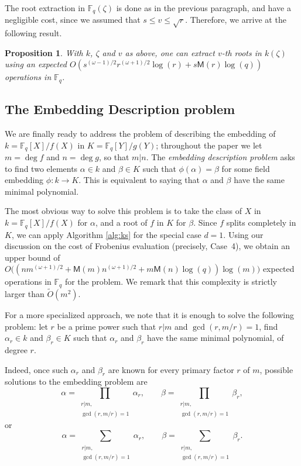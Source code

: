 \documentclass{mcom-l}
\theoremstyle{plain}
\newtheorem{proposition}[theorem]{Proposition}
\theoremstyle{definition}
\newcommand{\tildO}{\tilde{O}}
\newcommand{\F}{\ensuremath{\mathbb{F}}}
\newcommand{\MM}{\ensuremath{\mathsf{M}}}
\begin{document}
The root extraction in $\F_q(\zeta)$ is done as in the previous
paragraph, and have a negligible cost, since we assumed that $s \le v
\le \sqrt{r}$. Therefore, we arrive at the following result.

\begin{proposition}\label{prop:root_high_degree_extension}
With $k$, $\zeta$ and $v$ as above, one can extract $v$-th roots in
$k(\zeta)$ using an expected
$O(s^{(\omega-1)/2}r^{(\omega+1)/2}\log(r) + s\MM(r)\log(q))$
operations in $\F_q$.
\end{proposition}




\subsection{The Embedding Description problem}

We are finally ready to address the problem of describing the embedding of
$k=\F_q[X]/f(X)$ in $K=\F_q[Y]/g(Y)$; throughout the paper we let $m=\deg f$ and
$n=\deg g$, so that $m|n$. The \emph{embedding description problem}
asks to find two elements $\alpha\in k$ and $\beta\in K$ such that
$\phi(\alpha)=\beta$ for some field embedding $\phi:k\to K$. This is
equivalent to saying that $\alpha$ and $\beta$ have the same minimal polynomial.

The most obvious way to solve this problem is to take the class of $X$
in $k=\F_q[X]/f(X)$ for $\alpha$, and a root of $f$ in $K$ for
$\beta$. Since $f$ splits completely in $K$, we can apply Algorithm
\ref{alg:ks} for the special case $d = 1$. Using our discussion on the
cost of Frobenius evaluation (precisely, Case~4), we obtain an upper
bound of $O\bigl((nm^{(\omega+1)/2} + \MM(m)n^{(\omega+1)/2} +
m\MM(n)\log(q))\log(m)\bigr)$ expected operations in $\F_q$ for the
problem. We remark that this complexity is strictly larger than
$\tildO(m^2)$.

For a more specialized approach, we note that it is enough to solve
the following problem: let $r$ be a prime power such that $r|m$ and
$\gcd(r,m/r)=1$, find $\alpha_r\in k$ and $\beta_r\in K$ such that
$\alpha_r$ and $\beta_r$ have the same minimal polynomial, of degree $r$.

Indeed, once such $\alpha_r$ and $\beta_r$ are known for every primary
factor $r$ of $m$, possible solutions to the embedding problem are
\begin{equation*}
  \alpha = \prod_{\substack{r|m,\\\gcd(r,m/r)=1}}\alpha_r,\qquad
  \beta = \prod_{\substack{r|m,\\\gcd(r,m/r)=1}}\beta_r,
\end{equation*}
or
\begin{equation*}
  \alpha = \sum_{\substack{r|m,\\\gcd(r,m/r)=1}}\alpha_r,\qquad
  \beta = \sum_{\substack{r|m,\\\gcd(r,m/r)=1}}\beta_r.
\end{equation*}
\end{document}
